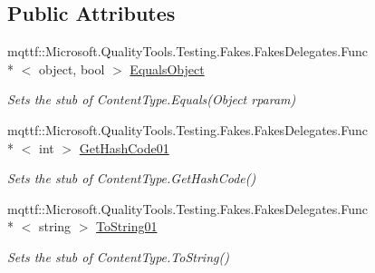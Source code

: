 \subsection*{Public Attributes}
\begin{DoxyCompactItemize}
\item 
mqttf\-::\-Microsoft.\-Quality\-Tools.\-Testing.\-Fakes.\-Fakes\-Delegates.\-Func\\*
$<$ object, bool $>$ \hyperlink{class_system_1_1_net_1_1_mime_1_1_fakes_1_1_stub_content_type_aabbacec61e7a6edc8fabc0334a9f606a}{Equals\-Object}
\begin{DoxyCompactList}\small\item\em Sets the stub of Content\-Type.\-Equals(\-Object rparam)\end{DoxyCompactList}\item 
mqttf\-::\-Microsoft.\-Quality\-Tools.\-Testing.\-Fakes.\-Fakes\-Delegates.\-Func\\*
$<$ int $>$ \hyperlink{class_system_1_1_net_1_1_mime_1_1_fakes_1_1_stub_content_type_a16ffe9a20bf44bd28a13d8508097159a}{Get\-Hash\-Code01}
\begin{DoxyCompactList}\small\item\em Sets the stub of Content\-Type.\-Get\-Hash\-Code()\end{DoxyCompactList}\item 
mqttf\-::\-Microsoft.\-Quality\-Tools.\-Testing.\-Fakes.\-Fakes\-Delegates.\-Func\\*
$<$ string $>$ \hyperlink{class_system_1_1_net_1_1_mime_1_1_fakes_1_1_stub_content_type_ab5a7976ae9d9ce982912fd19274d5c6d}{To\-String01}
\begin{DoxyCompactList}\small\item\em Sets the stub of Content\-Type.\-To\-String()\end{DoxyCompactList}\end{DoxyCompactItemize}
